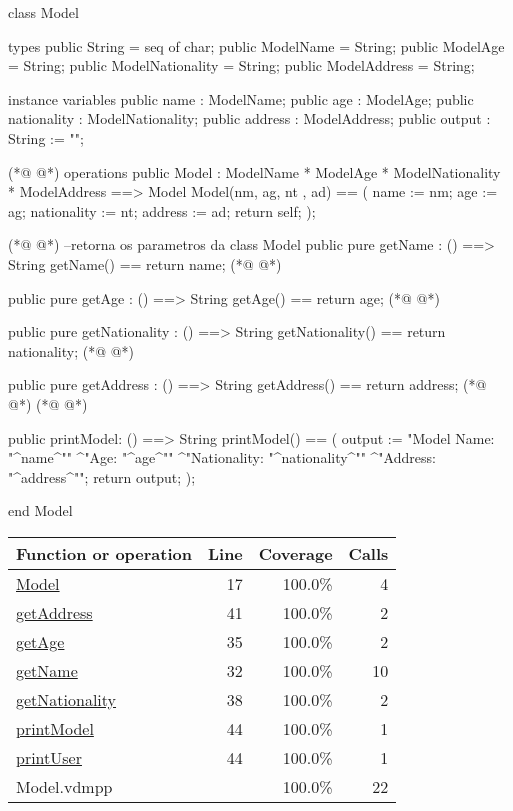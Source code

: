 \begin{vdmpp}[breaklines=true]
class Model

types
 public String = seq of char;
 public ModelName = String;
 public ModelAge = String;
 public ModelNationality = String;
 public ModelAddress = String;
 
instance variables
 public name : ModelName;
 public age : ModelAge;
 public nationality : ModelNationality;
 public address : ModelAddress;
 public output : String := "";
 
(*@
\label{Model:17}
@*)
 operations
  public Model : 
          ModelName * 
          ModelAge *
          ModelNationality * 
          ModelAddress ==> Model
  Model(nm, ag, nt , ad) ==
  (
    name := nm;
    age := ag;
    nationality := nt;
    address := ad;
    return self;
  );
  
(*@
\label{getName:32}
@*)
  --retorna os parametros da class Model
  public pure getName : () ==> String
    getName() == return name;
(*@
\label{getAge:35}
@*)
    
   public pure getAge : () ==> String
     getAge() == return age;
(*@
\label{getNationality:38}
@*)
     
  public pure getNationality : () ==> String
     getNationality() == return nationality;
(*@
\label{getAddress:41}
@*)
     
  public pure getAddress : () ==> String
     getAddress() == return address;      
(*@
\label{printModel:44}
@*)
(*@
\label{printUser:44}
@*)
  
  public printModel: () ==> String
  printModel() == (
  output := "Model Name: "^name^"\n"
       ^"Age: "^age^"\n"
       ^"Nationality: "^nationality^"\n"
       ^"Address: "^address^"\n";
  return output;
  );
    
  
end Model
\end{vdmpp}
\bigskip
\begin{longtable}{|l|r|r|r|}
\hline
Function or operation & Line & Coverage & Calls \\
\hline
\hline
\hyperref[Model:17]{Model} & 17&100.0\% & 4 \\
\hline
\hyperref[getAddress:41]{getAddress} & 41&100.0\% & 2 \\
\hline
\hyperref[getAge:35]{getAge} & 35&100.0\% & 2 \\
\hline
\hyperref[getName:32]{getName} & 32&100.0\% & 10 \\
\hline
\hyperref[getNationality:38]{getNationality} & 38&100.0\% & 2 \\
\hline
\hyperref[printModel:44]{printModel} & 44&100.0\% & 1 \\
\hline
\hyperref[printUser:44]{printUser} & 44&100.0\% & 1 \\
\hline
\hline
Model.vdmpp & & 100.0\% & 22 \\
\hline
\end{longtable}

